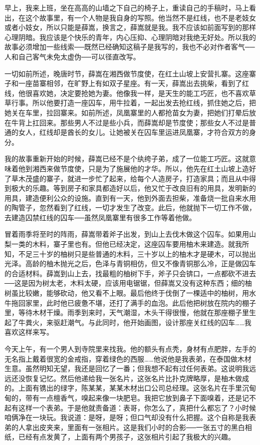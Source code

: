 早上，我来上班，坐在高高的山墙之下自己的椅子上，重读自己的手稿时，马上看出，在这个故事里，有一个人物是我自身的写照。他当然不是红线，也不是老妓女或者小妓女，所以只能是薛嵩，换言之，薛嵩就是我。我不应该如前面写到的那样心理阴暗。我应该是个快乐的青年，内心压抑、心理阴暗对我绝无好处。所以我的故事必须增加一些线索──既然已经确知这稿子是我写的，我也不必对作者客气──人和自己客气未免太虚伪──可以径直改写。 

一切如前所述，晚唐时节，薛嵩在湘西做节度使，在红土山坡上安营扎寨。这座寨子和一座苗寨相邻，在旷野上有如双子星座。有一天，薛嵩出去挑柴，看到了红线，他很喜欢她，决定要抢她为妻。他像我一样，是天生的能工巧匠，也不喜欢草草行事。所以他要打造一座囚车，用牛拉着，一起出发去抢红线，抓住她之后，把她关在车里，拉回寨来。如前所述，凤凰寨里的人都抢苗女为妻，把她们打晕后放在牛背上扛回来。那些男人不过是些小兵，而薛嵩却是节度使；那些女人不过是普通的女人，红线却是酋长的女儿。让她被关在囚车里运进凤凰寨，才符合双方的身分。 

我的故事重新开始的时候，薛嵩已经不是个纨绔子弟，成了一位能工巧匠。这就意味着他到湘西来做节度使，只是为了施展他的才华。所以，他先在红土山坡上造好了草木茂盛的寨子，就进一步忙了起来，给每个人造房子，打造家具；而且从中得到极大的乐趣。等到房子和家具都造好以后，他又忙于改良旧有的用具，发明新的用具，建造便利公众的设施。直到有一天，他到外面去担柴，准备烧一批自来水用的陶管子，忽然看到了红线，一切才发生了改变。此后，他就抛下一切工作不做，去建造囚禁红线的囚车──虽然凤凰寨里有很多工作等着他做。 

冒着雨季将至时的阵雨，薛嵩带着斧子出发，到山上去伐木做这个囚车。如果用山梨一类的木料，寨子里也有。但他已经决定，这座囚车要用柚木来建造。就我所知，不足三十岁的柚树只是些普通的木料，三十岁以上的柚木才是硬木，可以抛出光泽。高龄的柚木抛光之后，色泽与青铜相仿，但又不像青铜那么冷，正是做囚车的合适材料。薛嵩到山上去，找最粗的柚树下手，斧子只会锛口，一点都砍不进去──这是因为树太老，木料太硬，应该用电锯锯，但薛嵩又没有这种东西；细的柚树虽比较嫩，能够砍动，他又看不上眼。最后他终于伐倒了一棵适中的柚树，用水牛拖回家里，此时他已疲惫不堪，还打了满手的血泡。此后他把树放在院内的棚子里，等待木材干燥。雨季到来时，天气潮湿，木头干得很慢，他就在那座棚子里生起了牛粪火，来驱赶潮气。与此同时，他开始画图，设计那座关红线的囚车……我喜欢这样来写。 

今天上午，有一个男人到寺院里来找我。他的额头有点秃，身材有点肥胖，左手的无名指上戴着很宽的金戒指，穿着绿色的西服……他说他是我表弟，在泰国做木材生意。虽然明知无望，我还是回忆了一番；但我想不起有过任何表弟。这说明我远远还没恢复记忆。然后他递给我一张名片，这张名片比扑克牌略厚，是柚木做成的。上面有镌出的绿字，陈某某，某某木材出口公司总经理。这张名片在手里沉甸甸的，带有一点檀香气，嗅起来像一块肥皂。我把它放到鼻子下面嗅着，还是记不起有这样一个表弟。于是他就责备道：表哥，你怎么了，真把什么都忘了？小时候咱俩净在一块玩。我说道：是呀，是呀；但口气却没有什么把握。这个自称是我表弟的人拿出皮夹来，里面有一张相片。这是我们小时的合影──一张五寸的黑白相纸，已经有点发黄了，上面有两个男孩子，这张相片引起了我极大的兴趣。 

